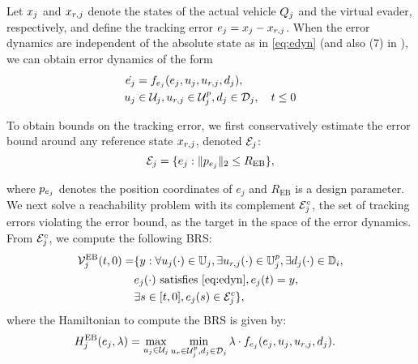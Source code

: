 Let $x_j$ and $x_{r,j}$ denote the states of the actual vehicle $Q_j$ and the virtual evader, respectively, and define the tracking error $e_j=x_j-x_{r,j}$. When the error dynamics are independent of the absolute state as in \eqref{eq:edyn} (and also (7) in \cite{Mitchell05}), we can obtain error dynamics of the form
\vspace{-0.15cm}
\begin{equation}
\label{eq:edyn} %
\begin{aligned}
\dot{e_j} &= \fdyn_{e_j}(e_j, \ctrl_j, \ctrl_{r,j},\dstb_j), \\
\ctrl_j &\in \cset_j, \ctrl_{r,j} \in \cset^p_j, \dstb_j \in \dset_j, \quad t \leq 0
\end{aligned}
\end{equation}

To obtain bounds on the tracking error, we first conservatively estimate the error bound around any reference state $x_{r,j}$, denoted $\mathcal{E}_j$:
\vspace{-0.1cm}
\begin{equation} \label{eqn:err}
\errorbound_j = \{e_j: \|\pos_{e_j}\|_2 \le R_{\text{EB}} \}, 
\end{equation}

\noindent where $p_{e_j}$ denotes the position coordinates of $e_j$ and $R_{\text{EB}}$ is a design parameter. We next solve a reachability problem with its complement $\mathcal{E}_j^c$, the set of tracking errors violating the error bound, as the target in the space of the error dynamics. From $\mathcal{E}_j^c$, we compute the following BRS:
\vspace{-0.1cm}
\begin{equation} \label{eqn:errBound}
\begin{aligned}
\brs^{\text{EB}}_{j}(t, 0) = & \{y: \forall \ctrl_j(\cdot) \in \cfset_j, \exists \ctrl_{r, j}(\cdot) \in \cfset^\pos_j, \exists \dstb_j(\cdot) \in \dfset_i, \\
& e_j(\cdot) \text{ satisfies \eqref{eq:edyn}}, e_j(t) = y, \\
& \exists s \in [t, 0], e_j(s) \in \errorbound_j^c\}, 
\end{aligned}
\end{equation}
where the Hamiltonian to compute the BRS is given by:
\begin{equation}
\begin{aligned}
H^{\text{EB}}_{j}(e_j, \lambda) &= \max_{u_j \in \mathcal{U}_j} \min_{u_r \in \mathcal{U}^p_j, d_j \in \mathcal{D}_j} \lambda \cdot f_{e_j}(e_j, u_j, u_{r,j}, d_j).
\end{aligned}
\end{equation}

